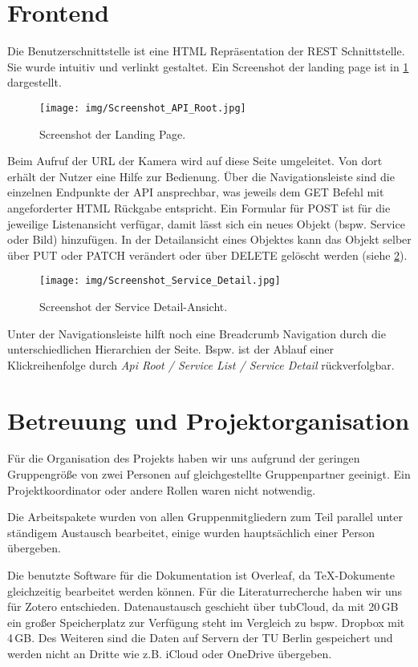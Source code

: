 \section{Frontend}
Die Benutzerschnittstelle ist eine HTML Repräsentation der REST Schnittstelle. Sie wurde intuitiv und verlinkt gestaltet. Ein Screenshot der landing page ist in \ref{fig:apiroot} dargestellt.
\begin{figure}[H]
    \centering
    \texttt{[image: img/Screenshot\_API\_Root.jpg]}
    \caption{Screenshot der Landing Page.}
    \label{fig:apiroot}
\end{figure}
Beim Aufruf der URL der Kamera wird auf diese Seite umgeleitet. Von dort erhält der Nutzer eine Hilfe zur Bedienung. Über die Navigationsleiste sind die einzelnen Endpunkte der API ansprechbar, was jeweils dem GET Befehl mit angeforderter HTML Rückgabe entspricht. Ein Formular für POST ist für die jeweilige Listenansicht verfügar, damit lässt sich ein neues Objekt (bspw. Service oder Bild) hinzufügen. In der Detailansicht eines Objektes kann das Objekt selber über PUT oder PATCH verändert oder über DELETE gelöscht werden (siehe \ref{fig:servicedetail}). 
\begin{figure}[H]
    \centering
    \texttt{[image: img/Screenshot\_Service\_Detail.jpg]}
    \caption{Screenshot der Service Detail-Ansicht.}
    \label{fig:servicedetail}
\end{figure}
Unter der Navigationsleiste hilft noch eine Breadcrumb Navigation durch die unterschiedlichen Hierarchien der Seite. Bspw. ist der Ablauf einer Klickreihenfolge durch \emph{Api Root / Service List / Service Detail} rückverfolgbar.

\section{Betreuung und Projektorganisation}

Für die Organisation des Projekts haben wir uns aufgrund der geringen Gruppengröße von zwei Personen auf gleichgestellte Gruppenpartner geeinigt. Ein Projektkoordinator oder andere Rollen waren nicht notwendig.\newline

Die Arbeitspakete wurden von allen Gruppenmitgliedern zum Teil parallel unter ständigem Austausch bearbeitet, einige wurden hauptsächlich einer Person übergeben. \newline 

Die benutzte Software für die Dokumentation ist Overleaf, da TeX-Dokumente gleichzeitig bearbeitet werden können. Für die Literaturrecherche haben wir uns für Zotero entschieden. Datenaustausch geschieht über tubCloud, da mit 20\,GB ein großer Speicherplatz zur Verfügung steht im Vergleich zu bspw. Dropbox mit 4\,GB. Des Weiteren sind die Daten auf Servern der TU Berlin gespeichert und werden nicht an Dritte wie z.B. iCloud oder OneDrive übergeben.